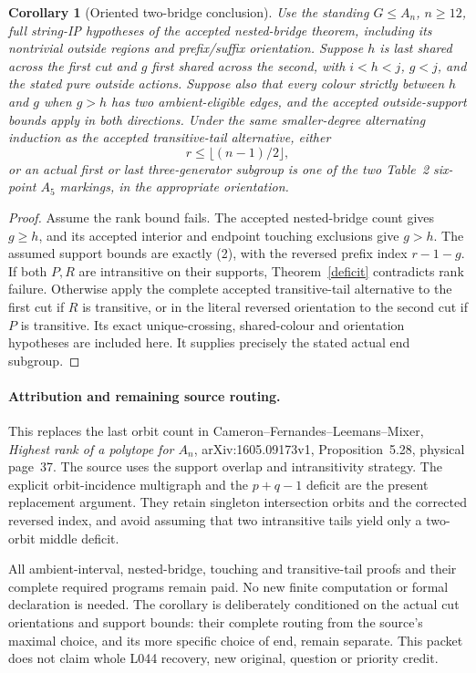 \documentclass[11pt,a4paper]{article}
\newtheorem{corollary}[lemma]{Corollary}
\begin{document}
\begin{corollary}[Oriented two-bridge conclusion]\label{bridge}
Use the standing $G\leq A_n$, $n\geq12$, full string-IP hypotheses
of the accepted nested-bridge theorem, including its nontrivial
outside regions and prefix/suffix orientation. Suppose $h$ is
last shared across the first cut and $g$ first shared across the
second, with $i<h<j$, $g<j$, and the stated pure outside actions.
Suppose also that every colour strictly between $h$ and $g$
when $g>h$ has two ambient-eligible edges, and the accepted
outside-support bounds apply in both directions. Under the same
smaller-degree alternating induction as the accepted transitive-tail
alternative, either
\[
 r\leq\lfloor(n-1)/2\rfloor,
\]
or an actual first or last three-generator subgroup is one of the
two Table~2 six-point $A_5$ markings, in the appropriate orientation.
\end{corollary}
\begin{proof}
Assume the rank bound fails. The accepted nested-bridge count gives
$g\geq h$, and its accepted interior and endpoint touching
exclusions give $g>h$. The assumed support bounds are exactly (2),
with the reversed prefix index $r-1-g$.
If both $P,R$ are intransitive on their supports,
Theorem~\ref{deficit} contradicts rank failure. Otherwise apply
the complete accepted transitive-tail alternative to the first
cut if $R$ is transitive, or in the literal reversed orientation
to the second cut if $P$ is transitive. Its exact unique-crossing,
shared-colour and orientation hypotheses are included here.
It supplies precisely the stated actual end subgroup.
\end{proof}

\paragraph{Attribution and remaining source routing.}
This replaces the last orbit count in Cameron--Fernandes--Leemans--Mixer,
\emph{Highest rank of a polytope for $A_n$}, arXiv:1605.09173v1,
Proposition~5.28, physical page~37. The source uses the support overlap
and intransitivity strategy. The explicit orbit-incidence multigraph
and the $p+q-1$ deficit are the present replacement argument.
They retain singleton intersection orbits and the corrected reversed
index, and avoid assuming that two intransitive tails yield only a
two-orbit middle deficit.

All ambient-interval, nested-bridge, touching and transitive-tail
proofs and their complete required programs remain paid. No new
finite computation or formal declaration is needed. The corollary
is deliberately conditioned on the actual cut orientations and
support bounds: their complete routing from the source's maximal
choice, and its more specific choice of end, remain separate.
This packet does not claim whole L044 recovery, new original,
question or priority credit.
\end{document}
